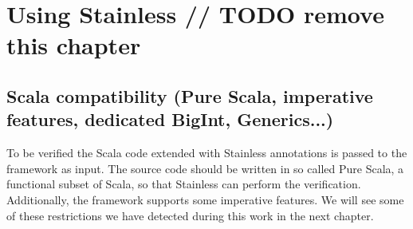 \chapter{Using Stainless // TODO remove this chapter}
\label{chap:using_stainless}

\section{Scala compatibility (Pure Scala, imperative features, dedicated BigInt, Generics...)}

To be verified the Scala code extended with Stainless annotations is passed to the framework as input.
The source code should be written in so called Pure Scala, a functional subset of Scala, so that Stainless can perform the verification.
Additionally, the framework supports some imperative features.
We will see some of these restrictions we have detected during this work in the next chapter.

